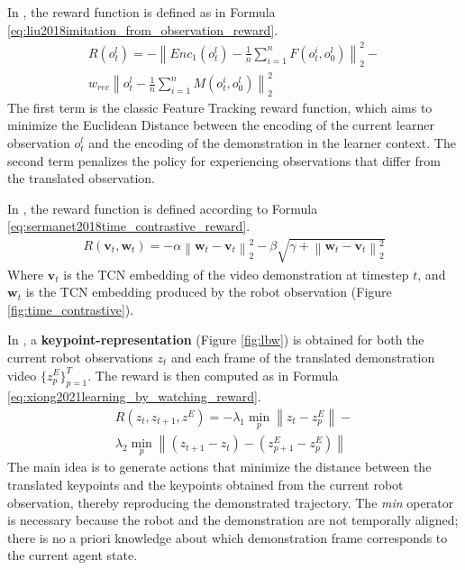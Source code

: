 In \cite{liu2018imitation_from_observation}, the reward function is defined as in Formula \ref{eq:liu2018imitation_from_observation_reward}.
\begin{equation}
    \label{eq:liu2018imitation_from_observation_reward}
    \begin{aligned}
        R(o^{l}_{t}) = -\left\|Enc_{1}(o^{l}_{t}) - \frac{1}{n} \sum_{i=1}^{n}F(o_{t}^{i},o_{0}^{l})\right\|^{2}_{2} - \\ w_{rec} \left\|o^{l}_{t} - \frac{1}{n} \sum_{i=1}^{n}M(o_{t}^{i},o_{0}^{l})\right\|^{2}_{2}
    \end{aligned}
\end{equation}
The first term is the classic Feature Tracking reward function, which aims to minimize the Euclidean Distance between the encoding of the current learner observation $o^{l}_{t}$ and the encoding of the demonstration in the learner context. The second term penalizes the policy for experiencing observations that differ from the translated observation.

In \cite{sermanet2018time_contrastive}, the reward function is defined according to Formula \ref{eq:sermanet2018time_contrastive_reward}.
\begin{equation}
    \label{eq:sermanet2018time_contrastive_reward}
    \begin{aligned}
        R(\textbf{v}_{t}, \textbf{w}_{t}) = - \alpha \left\| \textbf{w}_{t} - \textbf{v}_{t} \right\|^{2}_{2} - \beta \sqrt{\gamma + \left\| \textbf{w}_{t} - \textbf{v}_{t} \right\|^{2}_{2}}
    \end{aligned}
\end{equation}
Where $\textbf{v}_{t}$ is the TCN embedding of the video demonstration at timestep $t$, and $\textbf{w}_{t}$ is the TCN embedding produced by the robot observation (Figure \ref{fig:time_contrastive}).

In \cite{xiong2021learning_by_watching}, a \textbf{keypoint-representation} (Figure \ref{fig:lbw}) is obtained for both the current robot observations $z_{t}$ and each frame of the translated demonstration video $\{z^{E}_{p}\}_{p=1}^{T}$. The reward is then computed as in Formula \ref{eq:xiong2021learning_by_watching_reward}.
\begin{equation}
    \label{eq:xiong2021learning_by_watching_reward}
    \begin{aligned}
        R(z_{t},z_{t+1},z^{E}) = - \lambda_{1} \min_{p} \left\|z_{t}-z^{E}_{p}\right\| - \\ \lambda_{2} \min_{p} \left\|(z_{t+1}-z_{t}) - (z^{E}_{p+1}-z^{E}_{p})\right\|
    \end{aligned}
\end{equation}
The main idea is to generate actions that minimize the distance between the translated keypoints and the keypoints obtained from the current robot observation, thereby reproducing the demonstrated trajectory. The \textit{min} operator is necessary because the robot and the demonstration are not temporally aligned; there is no a priori knowledge about which demonstration frame corresponds to the current agent state.

